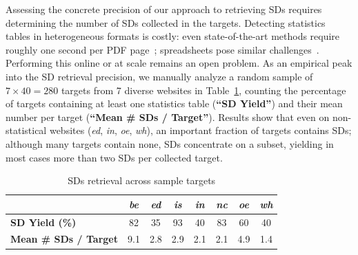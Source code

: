 Assessing the concrete precision of our approach to retrieving SDs
requires determining the number of SDs collected in the targets.
Detecting statistics tables in heterogeneous formats is costly: even
state-of-the-art methods require roughly one second per PDF
page~\cite{soric2025benchmarkingtableextractionheterogeneous};
spreadsheets pose similar challenges~\cite{vitagliano2021detecting}.
Performing this online or at scale remains an open problem. As an empirical peak into the SD retrieval precision, we manually analyze a random sample of $7\times 40=280$ targets from 7 diverse websites in Table~\ref{tab:stats_tables}, counting the percentage of targets containing at least one statistics table (\textbf{``SD Yield''}) and their mean number per target (\textbf{``Mean \# SDs / Target''}). Results show that even on non-statistical websites (\emph{ed}, \emph{in}, \emph{oe}, \emph{wh}), an important fraction of targets contains SDs; although many targets contain none, SDs concentrate on a subset, yielding in most cases more than two SDs per collected target.

\begin{table}
	\centering
	\caption{SDs retrieval across sample targets}
	\begin{tabular}{lccccccc}
		\toprule
		& \emph{be} & \emph{ed} & \emph{is} & \emph{in} & \emph{nc} & \emph{oe} & \emph{wh} \\
		\midrule
		\bfseries SD Yield (\%) & 82 & 35 & 93 & 40 & 83 & 60 & 40 \\
		\bfseries Mean \# SDs / Target & 9.1 & 2.8 & 2.9 & 2.1 & 2.1 & 4.9 & 1.4 \\
		\bottomrule
	\end{tabular}
	\label{tab:stats_tables}
\end{table}

